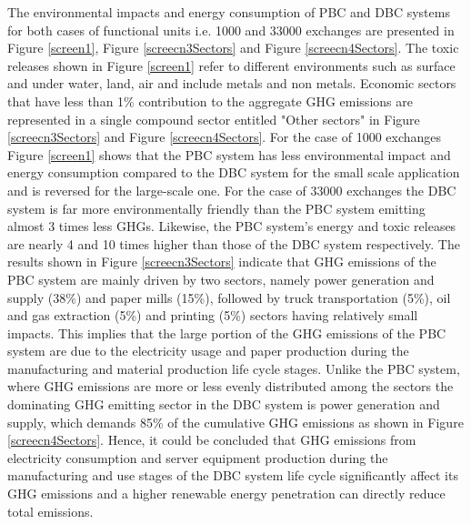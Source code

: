 \documentclass[3p,times,procedia]{elsarticle}
\begin{document}
The environmental impacts and energy consumption of PBC and DBC systems for both cases of functional units i.e. 1000 and 33000 exchanges are presented in Figure \ref{screen1}, Figure \ref{screecn3Sectors} and Figure \ref{screecn4Sectors}. The toxic releases shown in Figure \ref{screen1} refer to different environments such as surface and under water, land, air and include metals and non metals. Economic sectors that have less than 1\% contribution to the aggregate GHG emissions are represented in a single compound sector entitled "Other sectors" in Figure \ref{screecn3Sectors} and Figure \ref{screecn4Sectors}. For the case of 1000 exchanges Figure \ref{screen1} shows that the PBC system has less environmental impact and energy consumption compared to the DBC system for the small scale application and is reversed for the large-scale one. For the case of 33000 exchanges the DBC system is far more environmentally friendly than the PBC system emitting almost 3 times less GHGs. Likewise, the PBC system's energy and toxic releases are nearly 4 and 10 times higher than those of the DBC system respectively. The results shown in Figure \ref{screecn3Sectors} indicate that GHG emissions of the PBC system are mainly driven by two sectors, namely power generation and supply (38\%) and paper mills (15\%), followed by truck transportation (5\%), oil and gas extraction (5\%) and printing (5\%) sectors having relatively small impacts. This implies that the large portion of the GHG emissions of the PBC system are due to the electricity usage and paper production during the manufacturing and material production life cycle stages. Unlike the PBC system, where GHG emissions are more or less evenly distributed among the sectors the dominating GHG emitting sector in the DBC system is power generation and supply, which demands 85\% of the cumulative GHG emissions as shown in Figure \ref{screecn4Sectors}. Hence, it could be concluded that GHG emissions from electricity consumption and server equipment production during the manufacturing and use stages of the DBC system life cycle significantly affect its GHG emissions and a higher renewable energy penetration can directly reduce total emissions.
\end{document}
